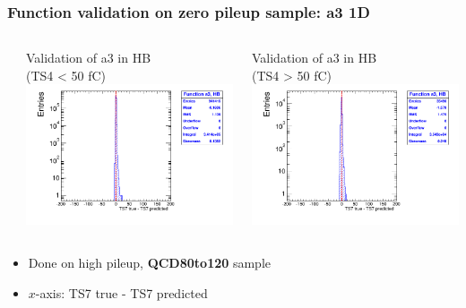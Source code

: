 \documentclass[bigger]{beamer}
\providecommand{\alert}[1]{\textbf{#1}}
\begin{document}
\begin{frame}
\frametitle{Function validation on zero pileup sample: a3 1D}
\label{sec-3-2-15}
\begin{columns} %
\label{sec-3-2-15-1}
\begin{column}{0.55\textwidth}
\label{sec-3-2-15-1-1}

\centering
Validation of a3 in HB \\ (TS4 < 50 fC)
\includegraphics[width=\textwidth]{fig/crosscheck_1D_sample80to120_a3_under50_ring0.png}
\end{column}
\begin{column}{0.55\textwidth}
\label{sec-3-2-15-1-2}

\centering
Validation of a3 in HB \\ (TS4 > 50 fC)
\includegraphics[width=\textwidth]{fig/crosscheck_1D_sample80to120_a3_over50_ring0.png}
\end{column}
\end{columns}
\label{sec-3-2-15-2}
\begin{itemize}

\item Done on high pileup, \alert{QCD80to120} sample
\label{sec-3-2-15-2-1}%

\item $x$-axis: TS7 true - TS7 predicted
\label{sec-3-2-15-2-2}%
\end{itemize} %
\end{frame}
\end{document}
